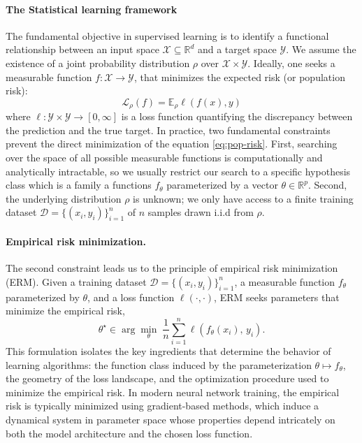 \paragraph{The Statistical learning framework}
The fundamental objective in supervised learning is to identify a functional
relationship between an input space $\mathcal{X} \subseteq \mathbb{R}^{d}$ and
a target space $\mathcal{Y}$. We assume the existence of a joint probability distribution
$\rho$ over  $\mathcal{X} \times \mathcal{Y}$. Ideally, one seeks a measurable function
$f: \mathcal{X} \to \mathcal{Y}$, that minimizes the expected risk (or population risk):
\begin{equation}
	\mathcal{L}_{\rho}(f) = \mathbb{E}_{\rho}\ell(f(x),y)
	\label{eq:pop-risk}
\end{equation}
where $\ell: \mathcal{Y} \times \mathcal{Y} \to [0, \infty]$ is a loss function quantifying
the discrepancy between the prediction and the true target.
In practice, two fundamental constraints prevent the direct minimization of the
equation \eqref{eq:pop-risk}. First, searching over the space of all possible
measurable functions is computationally and analytically intractable, so we
usually restrict our search to a specific hypothesis class which is a family a
functions $f_\theta$ parameterized by a vector $\theta \in \mathbb{R}^p$. Second, the
underlying distribution $\rho$ is unknown; we only have access to a finite
training dataset $\mathcal{D} = \{(x_i, y_i)\}_{i=1}^n$ of $n$ samples drawn
i.i.d from $\rho$.

\paragraph{Empirical risk minimization.}
The second constraint leads us to the principle of
empirical risk minimization (ERM). Given a training dataset $\mathcal{D} = \{(x_i,
	y_i)\}_{i=1}^n$, a measurable function $f_\theta$ parameterized by $\theta$, and a loss function
$\ell(\cdot,\cdot)$, ERM seeks parameters that minimize the empirical risk,
\begin{equation}
	\theta^\star \in
	\arg\min_{\theta} \; \frac{1}{n} \sum_{i=1}^n \ell\!\left(f_\theta(x_i),\,
	y_i\right).
\end{equation}
This formulation isolates the key ingredients that
determine the behavior of learning algorithms: the function class induced by
the parameterization $\theta \mapsto f_\theta$, the geometry of the loss
landscape, and the optimization procedure used to minimize the empirical risk.
In modern neural network training, the empirical risk is typically minimized
using gradient-based methods, which induce a dynamical system in parameter
space whose properties depend intricately on both the model architecture and
the chosen loss function.

